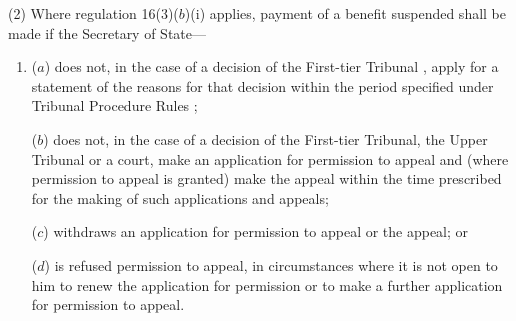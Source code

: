 \documentclass[12pt,a4paper]{article}
\begin{document}
%

(2) Where regulation 16(3)($b$)(i)  applies, payment of a benefit suspended shall be made if the Secretary of State—
\begin{enumerate}\item[]
($a$) does not, in the case of a decision of 
the First-tier Tribunal%
, apply for a statement of the reasons for that decision within the period 
specified under Tribunal Procedure Rules%
;

($b$) does not, in the case of a decision of 
the First-tier Tribunal, the Upper Tribunal  %
or a court, make an application for 
permission  %
to appeal and (where 
permission  %
to appeal is granted) make the appeal within the time prescribed for the making of such applications and appeals;

($c$) withdraws an application for 
permission  %
to appeal or the appeal; or

($d$) is refused 
permission  %
to appeal, in circumstances where it is not open to him to renew the application for 
permission  %
or to make a further application for 
permission  %
to appeal.
\end{enumerate}
\end{document}
